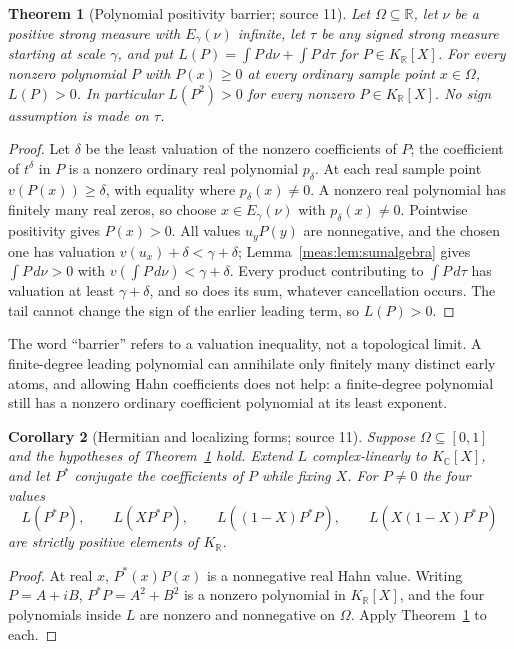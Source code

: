 \documentclass[11pt]{article}
\numberwithin{equation}{section}
\newtheorem{theorem}{Theorem}[section]
\newtheorem{corollary}[theorem]{Corollary}
\theoremstyle{definition}
\theoremstyle{remark}
\newcommand{\R}{\mathbb R}
\newcommand{\C}{\mathbb C}
\newcommand{\KR}{K_{\R}}
\newcommand{\KC}{K_{\C}}
\begin{document}
\begin{theorem}[Polynomial positivity barrier; source 11]\label{meas:thm:barrier}
Let $\Omega\subseteq\R$, let $\nu$ be a positive strong measure with
$E_\gamma(\nu)$ infinite, let
$\tau$ be any signed strong measure starting at scale $\gamma$, and put
$L(P)=\int P\,d\nu+\int P\,d\tau$ for $P\in\KR[X]$. For every nonzero polynomial
$P$ with $P(x)\ge0$ at every \emph{ordinary sample point} $x\in\Omega$,
$L(P)>0$. In particular $L(P^2)>0$ for every nonzero $P\in\KR[X]$. No sign
assumption is made on $\tau$.
\end{theorem}
\begin{proof}
Let $\delta$ be the least valuation of the nonzero coefficients of $P$; the
coefficient of $t^\delta$ in $P$ is a nonzero ordinary real polynomial
$p_\delta$. At each real sample point $v(P(x))\ge\delta$, with equality where
$p_\delta(x)\ne0$. A nonzero real polynomial has finitely many real zeros, so
choose $x\in E_\gamma(\nu)$ with $p_\delta(x)\ne0$. Pointwise positivity gives
$P(x)>0$. All values $u_yP(y)$ are nonnegative, and the chosen one has valuation
$v(u_x)+\delta<\gamma+\delta$; Lemma~\ref{meas:lem:sumalgebra} gives
$\int P\,d\nu>0$ with $v(\int P\,d\nu)<\gamma+\delta$. Every product contributing
to $\int P\,d\tau$ has valuation at least $\gamma+\delta$, and so does its sum,
whatever cancellation occurs. The tail cannot change the sign of the earlier
leading term, so $L(P)>0$.
\end{proof}

The word ``barrier'' refers to a valuation inequality, not a topological limit.
A finite-degree leading polynomial can annihilate only finitely many distinct
early atoms, and allowing Hahn coefficients does not help: a finite-degree
polynomial still has a nonzero ordinary coefficient polynomial at its least
exponent.

\begin{corollary}[Hermitian and localizing forms; source 11]
\label{meas:cor:hermitianbarrier}
Suppose $\Omega\subseteq[0,1]$ and the hypotheses of
Theorem~\ref{meas:thm:barrier} hold. Extend $L$ complex-linearly to $\KC[X]$, and
let $P^*$ conjugate the coefficients of $P$ while fixing $X$. For $P\ne0$ the
four values
\begin{equation}\label{meas:eq:fourpositive}
 L(P^*P),\qquad L(XP^*P),\qquad L((1-X)P^*P),\qquad L(X(1-X)P^*P)
\end{equation}
are strictly positive elements of $\KR$.
\end{corollary}
\begin{proof}
At real $x$, $P^*(x)P(x)$ is a nonnegative real Hahn value. Writing $P=A+iB$,
$P^*P=A^2+B^2$ is a nonzero polynomial in $\KR[X]$, and the four polynomials
inside $L$ are nonzero and nonnegative on $\Omega$. Apply
Theorem~\ref{meas:thm:barrier} to each.
\end{proof}
\end{document}
